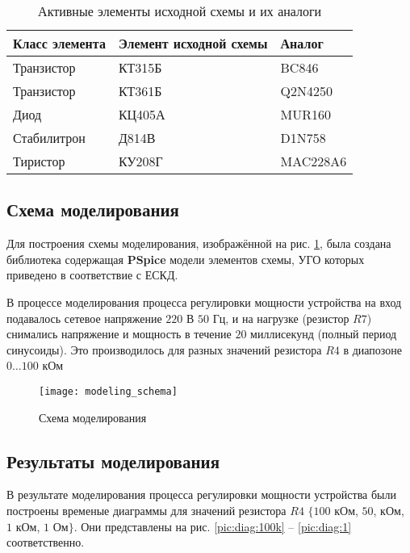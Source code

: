 \begin{table}[H]
\begin{center}
	\caption{Активные элементы исходной схемы и их аналоги}
	\label{tab:elements_analogs}
	\def\tabcolsep{10pt}
	\begin{tabular}{|l|l|l|}
		\hline
		Класс элемента &
		Элемент исходной схемы & 
		Аналог \\
		\hline
		Транзистор &
		КТ315Б &
		BC846 \\
		\hline
		Транзистор &
		КТ361Б &
		Q2N4250 \\
		\hline
		Диод &
		КЦ405А &
		MUR160 \\
		\hline
		Стабилитрон &
		Д814В &
		D1N758 \\
		\hline
		Тиристор &
		КУ208Г &
		MAC228A6 \\
		\hline
\end{tabular}
\end{center}
\end{table}

\subsection{Схема моделирования}

Для построения схемы моделирования, изображённой на рис. \ref{pic:mod_scheme}, была создана библиотека содержащая \textbf{PSpice} модели элементов схемы, УГО которых приведено  в соответствие с ЕСКД. 

В процессе моделирования процесса регулировки мощности устройства на вход подавалось сетевое напряжение $220$ В $50$ Гц, и на нагрузке (резистор $R7$) снимались напряжение и мощность в течение $20$ миллисекунд (полный период синусоиды). Это производилось для разных значений резистора $R4$ в диапозоне $0\dots100$ кОм

\begin{figure}[H]
\begin{center}
	\texttt{[image: modeling\_schema]}
	\caption{Схема моделирования}
	\label{pic:mod_scheme}
\end{center}
\end{figure}

\subsection{Результаты моделирования}

В результате моделирования процесса регулировки мощности устройства были построены временые диаграммы для значений резистора $R4$ $\{100$ кОм, $50$, кОм, $1$ кОм, $1$ Ом$\}$. Они представлены на рис. \ref{pic:diag:100k} -- \ref{pic:diag:1} соответственно.

